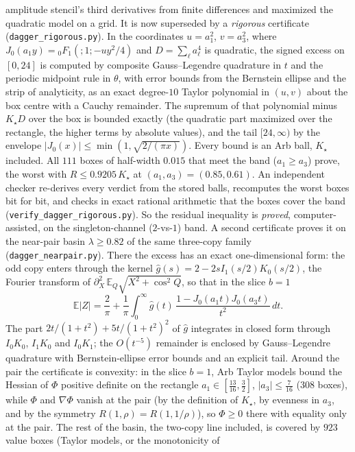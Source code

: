 amplitude stencil's third derivatives from finite differences and maximized the quadratic model on a grid. It is
now superseded by a \emph{rigorous} certificate (\texttt{dagger\_rigorous.py}). In the coordinates $u=a_1^2$,
$v=a_3^2$, where $J_0(a_1y)={}_0F_1(;1;-uy^2/4)$ and $D=\sum_\ell a_\ell^4$ is quadratic, the signed excess on
$[0,24]$ is computed by composite Gauss--Legendre quadrature in $t$ and the periodic midpoint rule in $\theta$, with
error bounds from the Bernstein ellipse and the strip of analyticity, as an exact degree-$10$ Taylor polynomial in
$(u,v)$ about the box centre with a Cauchy remainder. The supremum of that polynomial minus $K_\star D$ over the box
is bounded exactly (the quadratic part maximized over the rectangle, the higher terms by absolute values), and the
tail $[24,\infty)$ by the envelope $|J_0(x)|\le\min(1,\sqrt{2/(\pi x)})$. Every bound is an Arb ball, $K_\star$
included. All $111$ boxes of half-width $0.015$ that meet the band ($a_1\ge a_3$) prove, the worst with
$R\le0.9205\,K_\star$ at $(a_1,a_3)=(0.85,0.61)$. An independent checker re-derives every verdict from the stored
balls, recomputes the worst boxes bit for bit, and checks in exact rational arithmetic that the boxes cover the
band (\texttt{verify\_dagger\_rigorous.py}). So the residual inequality is \emph{proved}, computer-assisted, on the
singleton-channel ($2$-vs-$1$) band. A second certificate proves it on the near-pair basin $\lambda\ge0.82$ of the
same three-copy family (\texttt{dagger\_nearpair.py}). There the excess has an exact one-dimensional form: the odd
copy enters through the kernel $\hat g(s)=2-2sI_1(s/2)K_0(s/2)$, the Fourier transform of
$\partial_X^2\,\mathbb E_Q\sqrt{X^2+\cos^2Q}$, so that in the slice $b=1$
\[
  \mathbb E|Z|=\frac2\pi+\frac1\pi\int_0^\infty\hat g(t)\,\frac{1-J_0(a_1t)J_0(a_3t)}{t^2}\,dt .
\]
The part $2t/(1+t^2)+5t/(1+t^2)^2$ of $\hat g$ integrates in closed form through $I_0K_0$, $I_1K_0$ and $I_0K_1$;
the $O(t^{-5})$ remainder is enclosed by Gauss--Legendre quadrature with Bernstein-ellipse error bounds and an
explicit tail. Around the pair the certificate is convexity: in the slice $b=1$, Arb Taylor models bound the
Hessian of $\Phi$ positive definite on the rectangle $a_1\in[\tfrac{13}{16},\tfrac32]$, $|a_3|\le\tfrac7{16}$
($308$ boxes), while $\Phi$ and $\nabla\Phi$ vanish at the pair (by the definition of $K_\star$, by evenness in
$a_3$, and by the symmetry $R(1,\rho)=R(1,1/\rho)$), so $\Phi\ge0$ there with equality only at the pair. The rest
of the basin, the two-copy line included, is covered by $923$ value boxes (Taylor models, or the monotonicity of
